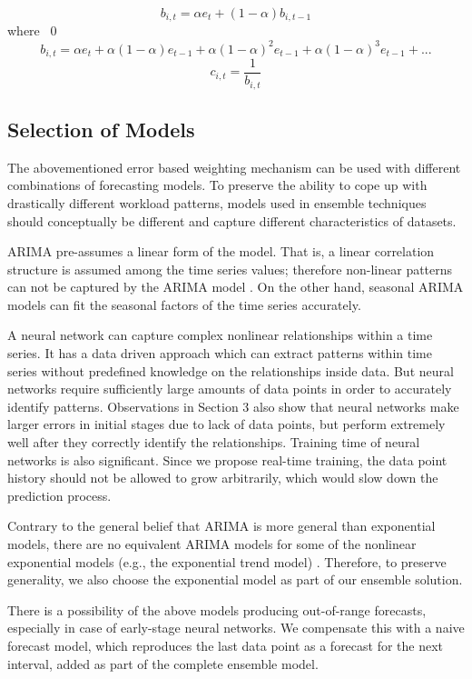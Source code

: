 $$b_{i,t}= \alpha e_t + (1-\alpha)b_{i,t-1}$$
where \ 0\leq \alpha {}	\\
$$b_{i,t}=\alpha e_t + \alpha(1-\alpha)e_{t-1}+\alpha(1-\alpha)^2e_{t-1}+\alpha(1-\alpha)^3e_{t-1}+ . .. $$
$$c_{i,t}=\frac{1}{b_{i,t}}$$

\subsection{Selection of Models}
The abovementioned error based weighting mechanism can be used with different combinations of forecasting models. To preserve the ability to cope up with drastically different workload patterns, models used in ensemble techniques should conceptually be different and capture different characteristics of datasets.

ARIMA pre-assumes a linear form of the model. That is, a linear correlation structure is assumed among the time series values; therefore non-linear patterns can not be captured by the ARIMA model \cite{Zhang_2003}. On the other hand, seasonal ARIMA models can fit the seasonal factors of the time series accurately.

A neural network can capture complex nonlinear relationships within a time series. It has a data driven approach which can extract patterns within time series without predefined knowledge on the relationships inside data. But neural networks require sufficiently large amounts of data points in order to accurately identify patterns. Observations in Section 3 also show that neural networks make larger errors in initial stages due to lack of data points, but perform extremely well after they correctly identify the relationships. Training time of neural networks is also significant. Since we propose real-time training, the data point history should not be allowed to grow arbitrarily, which would slow down the prediction process.

Contrary to the general belief that ARIMA is more general than exponential models, there are no equivalent ARIMA models for some of the nonlinear exponential models (e.g., the exponential trend model) \cite{AHyndman 2013}. Therefore, to preserve generality, we also choose the exponential model as part of our ensemble solution.

There is a possibility of the above models producing out-of-range forecasts, especially in case of early-stage neural networks. We compensate this with a naive forecast model, which reproduces the last data point as a forecast for the next interval, added as part of the complete ensemble model.


